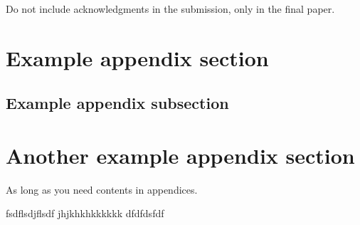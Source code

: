 \documentclass{article}
\begin{document}
Do not include acknowledgments in the submission, only in the final paper.

\clearpage
\small



\clearpage
\normalsize
\appendix
\section{Example appendix section}
\subsection{Example appendix subsection}
\section{Another example appendix section}

As long as you need contents in appendices.

fsdflsdjflsdf
jhjkhkhkkkkkk
dfdfdsfdf
\end{document}
